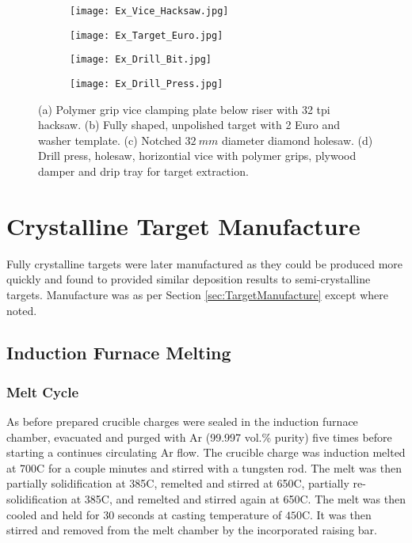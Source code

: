\documentclass[a4paper,12pt,oneside]{report}%
\begin{document}
\begin{figure}[htbp]
	\centering
	\begin{subfigure}[htbp]{0.49\textwidth}
		\texttt{[image: Ex\_Vice\_Hacksaw.jpg]}
		\caption{}
		\label{fig:Vice}
	\end{subfigure}
	\begin{subfigure}[htbp]{0.38\textwidth}
		\texttt{[image: Ex\_Target\_Euro.jpg]}
		\caption{}
		\label{fig:TargetEuro}
	\end{subfigure}
	\begin{subfigure}[htbp]{0.275\textwidth}
		\texttt{[image: Ex\_Drill\_Bit.jpg]}
		\caption{}
		\label{fig:DrillBit}
	\end{subfigure}
	\begin{subfigure}[htbp]{0.30\textwidth}
		\texttt{[image: Ex\_Drill\_Press.jpg]}
		\caption{}
		\label{fig:DrillPress}
	\end{subfigure}
	\caption{(a) Polymer grip vice clamping plate below riser with 32 \acrshort{tpi} hacksaw. (b) Fully shaped, unpolished target with 2 Euro and washer template. (c) Notched $32~ mm$ diameter diamond holesaw. (d) Drill press, holesaw, horizontial vice with polymer grips, plywood damper and drip tray for target extraction.}%
	\label{fig:ShapingEquipment}
\end{figure}

\section{Crystalline Target Manufacture} \label{sec:CrystalTargetManufacture}
Fully crystalline targets were later manufactured as they could be produced more quickly and found to provided similar deposition results to semi-crystalline targets. Manufacture was as per Section \ref{sec:TargetManufacture} except where noted.

\subsection{Induction Furnace Melting}
\subsubsection{Melt Cycle}
As before prepared crucible charges were sealed in the induction furnace chamber, evacuated and purged with Ar (99.997 vol.\% purity) five times before starting a continues circulating Ar flow. The crucible charge was induction melted at 700\degree C for a couple minutes and stirred with a tungsten rod. The melt was then partially solidification at 385\degree C, remelted and stirred at 650\degree C, partially re-solidification at 385\degree C, and remelted and stirred again at 650\degree C. The melt was then cooled and held for 30 seconds at casting temperature of $450$\degree C. It was then stirred and removed from the melt chamber by the incorporated raising bar. 
\end{document}
